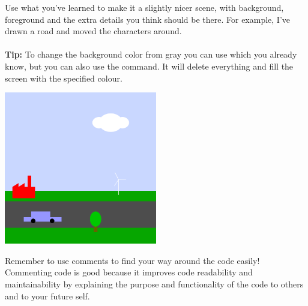 \begin{exercisebox}[adjusted title=Green City]

Use what you've learned to make it a slightly nicer scene, with background, foreground and the extra details you think should be there. For example, I've drawn a road and moved the characters around. 
\\
\\
\textbf{Tip: }To change the background color from gray you can use  which you
already know, but you can also use the  command.
It will delete everything and fill the screen with the specified colour.

\begin{center}
\includegraphics[width=0.5\textwidth]{illustrationer/elbil.png}
\end{center}

\noindent
Remember to use comments to find your way around the code easily!
Commenting code is good because it improves code readability and maintainability by explaining the purpose and functionality of the code to others and to your future self.



\end{exercisebox}